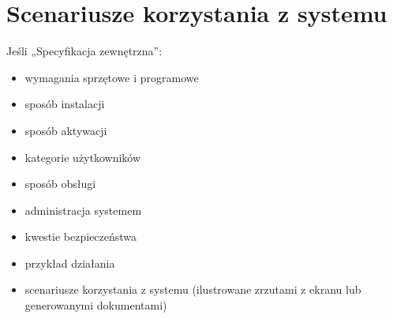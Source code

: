 \documentclass[a4paper,twoside,12pt]{book}
\begin{document}
\section{Scenariusze korzystania z systemu}
\label{Scenariusze-korzystania-z-systemu}



Jeśli „Specyfikacja zewnętrzna”:
\begin{itemize}
\item  wymagania sprzętowe i programowe
\item  sposób instalacji
\item  sposób aktywacji
\item  kategorie użytkowników
\item  sposób obsługi
\item  administracja systemem
\item  kwestie bezpieczeństwa
\item  przykład działania
\item  scenariusze korzystania z systemu (ilustrowane zrzutami z ekranu lub generowanymi dokumentami)
\end{itemize}

%
%
%
%
%        
\end{document}
